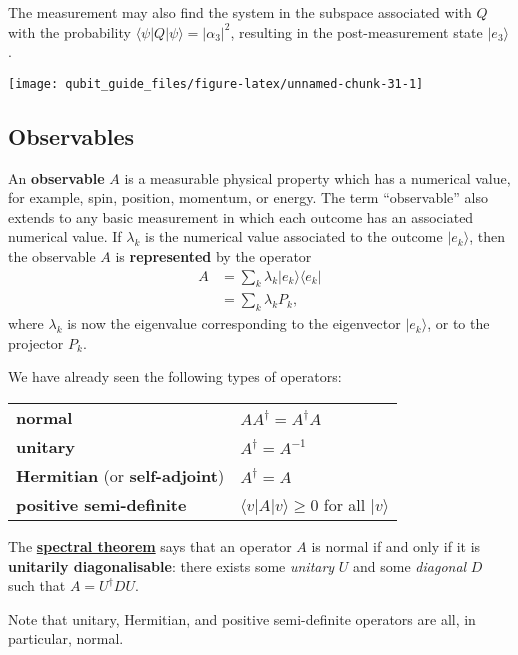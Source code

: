 \documentclass[fleqn]{article}
\newenvironment{idea}{\noindent}{\medskip}
\begin{document}
The measurement may also find the system in the subspace associated with \(Q\) with the probability \(\langle\psi|Q|\psi\rangle = |\alpha_3|^2\), resulting in the post-measurement state \(|e_3\rangle\).

\begin{center}\texttt{[image: qubit\_guide\_files/figure-latex/unnamed-chunk-31-1]} \end{center}

\hypertarget{observables}{%
\subsection{Observables}\label{observables}}

An \textbf{observable} \(A\) is a measurable physical property which has a numerical value, for example, spin, position, momentum, or energy.
The term ``observable'' also extends to any basic measurement in which each outcome has an associated numerical value.
If \(\lambda_k\) is the numerical value associated to the outcome \(|e_k\rangle\), then the observable \(A\) is \textbf{represented} by the operator
\[
  \begin{aligned}
    A
    &= \sum_k \lambda_k |e_k\rangle\langle e_k|
  \\&= \sum_k \lambda_k P_k,
  \end{aligned}
\]
where \(\lambda_k\) is now the eigenvalue corresponding to the eigenvector \(|e_k\rangle\), or to the projector \(P_k\).

\begin{idea}
We have already seen the following types of operators:

\begin{longtable}[]{@{}
  >{\raggedright\arraybackslash}p{}
  >{\raggedright\arraybackslash}p{}@{}}
\toprule()
\endhead
\textbf{normal} & \(AA^\dagger = A^\dagger A\) \\
\textbf{unitary} & \(A^\dagger = A^{-1}\) \\
\textbf{Hermitian} (or \textbf{self-adjoint}) & \(A^\dagger = A\) \\
\textbf{positive semi-definite} & \(\langle v|A|v\rangle\geqslant 0\) for all \(|v\rangle\) \\
\bottomrule()
\end{longtable}

The \href{https://en.wikipedia.org/wiki/Spectral_theorem}{\textbf{spectral theorem}} says that an operator \(A\) is normal if and only if it is \textbf{unitarily diagonalisable}: there exists some \emph{unitary} \(U\) and some \emph{diagonal} \(D\) such that \(A=U^\dagger DU\).

Note that unitary, Hermitian, and positive semi-definite operators are all, in particular, normal.

\end{idea}
\end{document}
